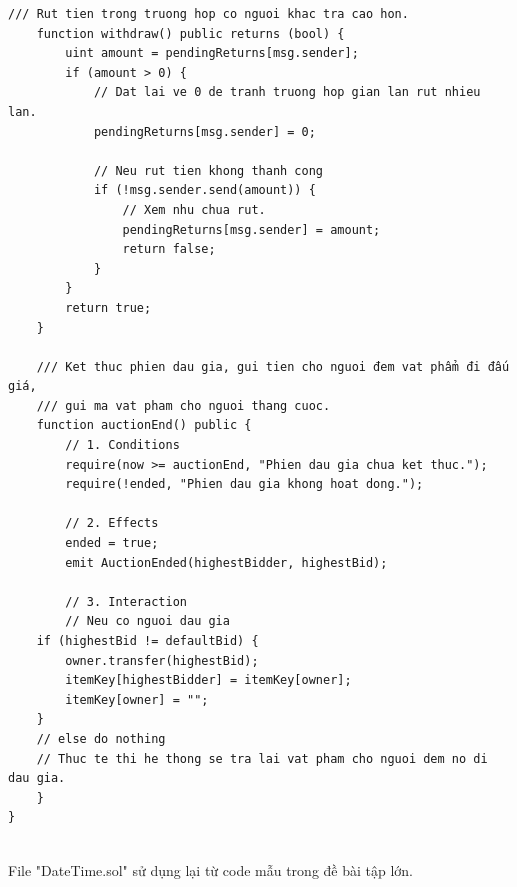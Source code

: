 \documentclass[a4paper]{article}
\begin{document}
\begin{frame}
\begin{lstlisting}[basicstyle=\small]
    /// Rut tien trong truong hop co nguoi khac tra cao hon.
    function withdraw() public returns (bool) {
        uint amount = pendingReturns[msg.sender];
        if (amount > 0) {
            // Dat lai ve 0 de tranh truong hop gian lan rut nhieu lan.
            pendingReturns[msg.sender] = 0;
            
            // Neu rut tien khong thanh cong
            if (!msg.sender.send(amount)) {
                // Xem nhu chua rut.
                pendingReturns[msg.sender] = amount;
                return false;
            }
        }
        return true;
    }

    /// Ket thuc phien dau gia, gui tien cho nguoi đem vat phẩm đi đấu giá,
    /// gui ma vat pham cho nguoi thang cuoc.
    function auctionEnd() public {
        // 1. Conditions
        require(now >= auctionEnd, "Phien dau gia chua ket thuc.");
        require(!ended, "Phien dau gia khong hoat dong.");

        // 2. Effects
        ended = true;
        emit AuctionEnded(highestBidder, highestBid);

        // 3. Interaction
        // Neu co nguoi dau gia
	if (highestBid != defaultBid) {
	    owner.transfer(highestBid);
	    itemKey[highestBidder] = itemKey[owner];
	    itemKey[owner] = "";
	}
	// else do nothing
	// Thuc te thi he thong se tra lai vat pham cho nguoi dem no di dau gia.
    }
}
\end{lstlisting}
\end{frame}\\

File "DateTime.sol" sử dụng lại từ code mẫu trong đề bài tập lớn.
\end{document}
